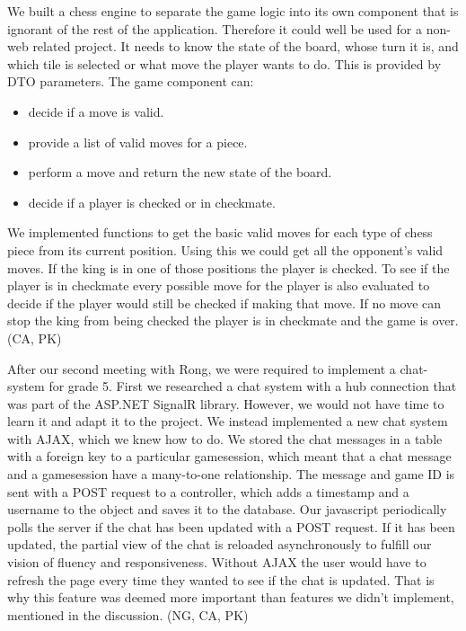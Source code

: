 \documentclass[acmlarge, review=false, screen=true]{acmart}
\begin{document}
    We built a chess engine to separate the game logic into its own component that is ignorant of the rest of the application. Therefore it could well be used for a non-web related project. It needs to know the state of the board, whose turn it is, and which tile is selected or what move the player wants to do. This is provided by DTO parameters. The game component can:
    \begin{itemize}
      \item decide if a move is valid.
      \item provide a list of valid moves for a piece.
      \item perform a move and return the new state of the board.
      \item decide if a player is checked or in checkmate.
    \end{itemize}
    
    We implemented functions to get the basic valid moves for each type of chess piece from its current position. Using this we could get all the opponent’s valid moves. If the king is in one of those positions the player is checked. To see if the player is in checkmate every possible move for the player is also evaluated to decide if the player would still be checked if making that move. If no move can stop the king from being checked the player is in checkmate and the game is over. (CA, PK)
    
    After our second meeting with Rong, we were required to implement a chat-system for grade 5. First we researched a chat system with a hub connection that was part of the ASP.NET SignalR library\cite{signalr}. However, we would not have time to learn it and adapt it to the project. We instead implemented a new chat system with AJAX, which we knew how to do. We stored the chat messages in a table with a foreign key to a particular gamesession, which meant that a chat message and a gamesession have a many-to-one relationship. The message and game ID is sent with a POST request to a controller, which adds a timestamp and a username to the object and saves it to the database. Our javascript periodically polls the server if the chat has been updated with a POST request. If it has been updated, the partial view of the chat is reloaded asynchronously to fulfill our vision of fluency and responsiveness. Without AJAX the user would have to refresh the page every time they wanted to see if the chat is updated. That is why this feature was deemed more important than features we didn't implement, mentioned in the discussion. (NG, CA, PK)
\end{document}
